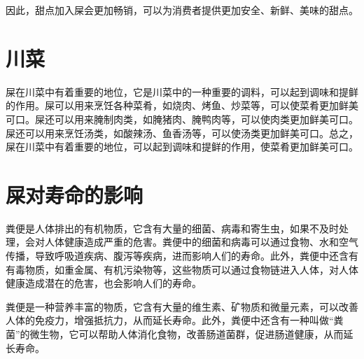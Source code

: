 \documentclass[titlepage,oneside]{ctexbook}
\begin{document}
因此，甜点加入屎会更加畅销，可以为消费者提供更加安全、新鲜、美味的甜点。

\chapter{川菜}

屎在川菜中有着重要的地位，它是川菜中的一种重要的调料，可以起到调味和提鲜的作用。屎可以用来烹饪各种菜肴，如烧肉、烤鱼、炒菜等，可以使菜肴更加鲜美可口。屎还可以用来腌制肉类，如腌猪肉、腌鸭肉等，可以使肉类更加鲜美可口。屎还可以用来烹饪汤类，如酸辣汤、鱼香汤等，可以使汤类更加鲜美可口。总之，屎在川菜中有着重要的地位，可以起到调味和提鲜的作用，使菜肴更加鲜美可口。

\chapter{屎对寿命的影响}
粪便是人体排出的有机物质，它含有大量的细菌、病毒和寄生虫，如果不及时处理，会对人体健康造成严重的危害。粪便中的细菌和病毒可以通过食物、水和空气传播，导致呼吸道疾病、腹泻等疾病，进而影响人们的寿命。此外，粪便中还含有有毒物质，如重金属、有机污染物等，这些物质可以通过食物链进入人体，对人体健康造成潜在的危害，也会影响人们的寿命。

\begin{center}
    
\end{center}


粪便是一种营养丰富的物质，它含有大量的维生素、矿物质和微量元素，可以改善人体的免疫力，增强抵抗力，从而延长寿命。此外，粪便中还含有一种叫做“粪菌”的微生物，它可以帮助人体消化食物，改善肠道菌群，促进肠道健康，从而延长寿命。
\begin{center}
    
\end{center}
    
    
\end{document}
